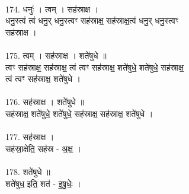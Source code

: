 \\
174. धनुः॑ । त्वम् । सह॑स्राक्ष ।\\
धनु॒स्त्वं त्वं धनु॒र् धनु॒स्त्वꣳ सह॑स्राक्ष॒ सह॑स्राक्ष॒त्वं धनु॒र् धनु॒स्त्वꣳ\\
सह॑स्राक्ष ।\\
\\
175. त्वम् । सह॑स्राक्ष । शते॑षुधे ॥\\
त्वꣳ सह॑स्राक्ष॒ सह॑स्राक्ष॒ त्वं त्वꣳ सह॑स्राक्ष॒ शते॑षुधे॒ शते॑षुधे॒ सह॑स्राक्ष॒\\
त्वं त्वꣳ सह॑स्राक्ष॒ शते॑षुधे ।\\
\\
176. सह॑स्राक्ष । शते॑षुधे ॥\\
सह॑स्राक्ष॒ शते॑षुधे॒ शते॑षुधे॒ सह॑स्राक्ष॒ सह॑स्राक्ष॒ शते॑षुधे ।\\
\\
177. सह॑स्राक्ष ।\\
सह॑स्रा॒क्षेति॒ सह॑स्र - अ॒क्ष॒ ।\\
\\
178. शते॑षुधे ॥\\
शते॑षुध॒ इति॒ शत॑ - इ॒षु॒धेः॒ ।\\
\\
